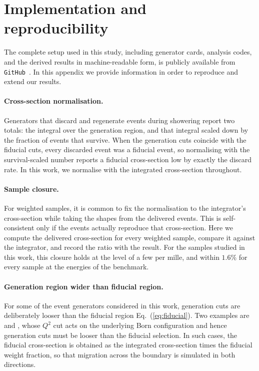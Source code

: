 
\section{Implementation and reproducibility}
\label{app:implementation}

The complete setup used in this study, including generator cards, analysis codes, and the derived results
in machine-readable form, is publicly available from {\tt GitHub}~\cite{benchmarkrepo}.  
%
In this appendix we provide information in order to reproduce and extend our results. 

\paragraph{Cross-section normalisation.}  
%
Generators that discard and regenerate events during showering report two totals: the integral over the generation region, and that integral scaled down by the fraction of events that survive. 
%
When the generation cuts coincide with the fiducial cuts, every discarded event was a fiducial event, so normalising with the survival-scaled number reports a fiducial cross-section low by exactly the discard rate.
%
In this work, we normalise with the
integrated cross-section throughout.

\paragraph{Sample closure.}  For weighted samples, it is common to fix the normalisation to the integrator's cross-section while taking the shapes from
the delivered events.  
%
This is self-consistent only if the events actually
reproduce that cross-section.
%
Here we compute the delivered cross-section for every weighted sample, compare it against the integrator, and record the ratio with the result.  
%
For the samples studied in this work, this closure holds at the level of a few per mille, and within $1.6\%$ for every sample at the energies of the benchmark.

\paragraph{Generation region wider than fiducial region.}
%
For some of the event generators considered in this work,  generation cuts are deliberately looser than the fiducial region Eq.~(\ref{eq:fiducial}).
%
Two examples are \powhegres and \powhegtwo, whose $Q^2$ cut acts on the underlying Born configuration and hence generation cuts must be looser than the fiducial selection. 
%
In such cases, the fiducial cross-section is obtained as the integrated cross-section times the fiducial weight fraction, so that migration across the boundary is simulated in both directions.

